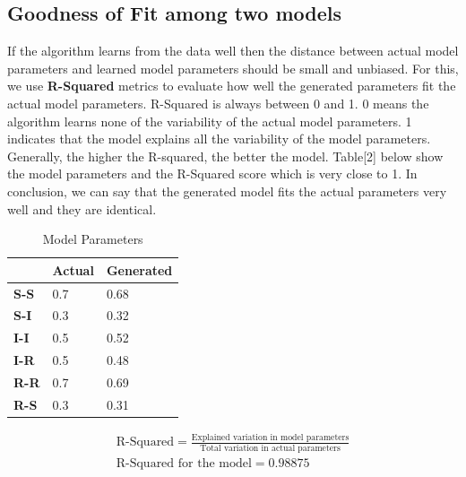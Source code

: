 \documentclass[11pt, a4paper]{article} %
\begin{document}
\subsection{ Goodness of Fit among two models}
If the algorithm learns from the data well then the distance between actual model parameters and learned model parameters should be small and unbiased. For this, we use \textbf{R-Squared} metrics to evaluate how well the generated parameters fit the actual model parameters. R-Squared is always between 0 and 1. 0 means the algorithm learns none of the variability of the actual model parameters. 1 indicates that the model explains all the variability of the model parameters. Generally, the higher the R-squared, the better the model.
 Table[2] below show the model parameters and the R-Squared score which is very close to 1. In conclusion, we can say that the generated model fits the actual parameters very well and they are identical.
\begin{table}[h!]
	\centering
	\label{table:param}
	\caption{Model Parameters}
	\begin{tabular}{|l|l|l|}
		\hline
		& \textbf{Actual} & \textbf{Generated} \\ \hline
		\textbf{S-S} & 0.7             & 0.68               \\ \hline
		\textbf{S-I} & 0.3             & 0.32               \\ \hline
		\textbf{I-I} & 0.5             & 0.52               \\ \hline
		\textbf{I-R} & 0.5             & 0.48               \\ \hline
		\textbf{R-R} & 0.7             & 0.69               \\ \hline
		\textbf{R-S} & 0.3             & 0.31               \\ \hline
	\end{tabular}
\end{table}

\begin{equation}
\begin{gathered}
\text{R-Squared} = \frac{\text{Explained variation in model parameters}}{\text{Total variation in actual parameters}} \\
\text{R-Squared for the model} = 0.98875
\end{gathered}
\end{equation}
\end{document}
